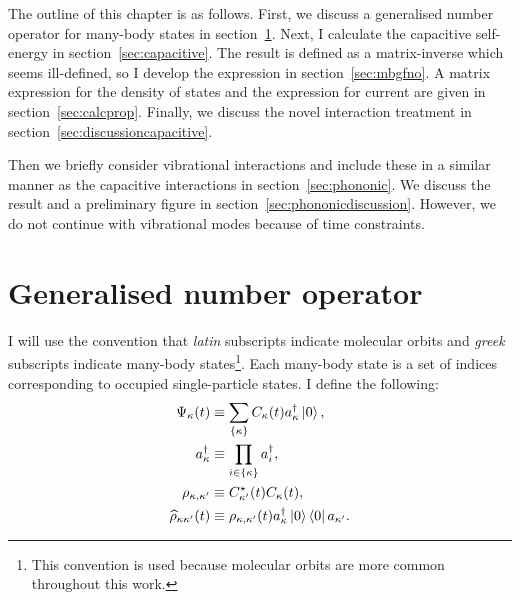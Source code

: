 The outline of this chapter is as follows. First, we discuss a generalised number operator for many-body states in section~\ref{sec:gno}. Next, I calculate the capacitive self-energy in section~\ref{sec:capacitive}. The result is defined as a matrix-inverse which seems ill-defined, so I develop the expression in section~\ref{sec:mbgfno}. A matrix expression for the density of states and the expression for current are given in section~\ref{sec:calcprop}. Finally, we discuss the novel interaction treatment in section~\ref{sec:discussioncapacitive}.

Then we briefly consider vibrational interactions and include these in a similar manner as the capacitive interactions in section~\ref{sec:phononic}. We discuss the result and a preliminary figure in section~\ref{sec:phononicdiscussion}. However, we do not continue with vibrational modes because of time constraints.
\section{Generalised number operator}
\label{sec:gno}


I will use the convention that \emph{latin} subscripts indicate molecular orbits and \emph{greek} subscripts indicate many-body states\footnote{This convention is used because molecular orbits are more common throughout this work.}. Each many-body state is a set of indices corresponding to occupied single-particle states. I define the following:
\begin{align*}
\Psi_\kappa (t) &\equiv \sum_{ \left\{\kappa\right\}} C_\kappa(t) a_\kappa^\dagger \ket{0}, \\
a^\dagger_\kappa &\equiv \prod_{ i \in \left\{\kappa\right\}} a_i^\dagger, \\
\rho_{\kappa,\kappa^\prime} & \equiv C_{\kappa'}^\star (t) C_\kappa (t),
\\
\widehat{\rho}_{\kappa\kappa^\prime}(t) &\equiv \rho_{\kappa,\kappa^\prime} (t) a_{\kappa}^\dagger \ket{0}\bra{0}a_{\kappa^\prime}.
\end{align*}

